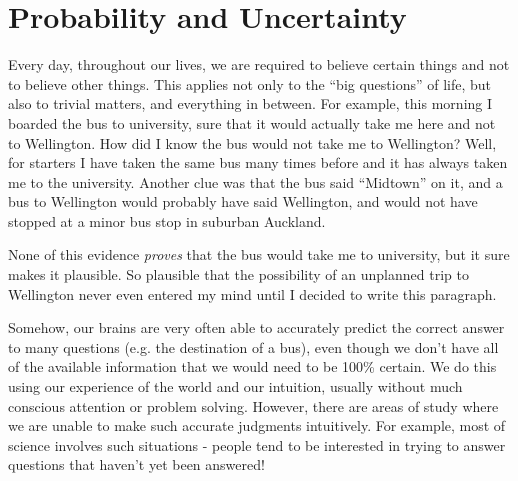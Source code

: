 \chapter{Probability and Uncertainty}
Every day, throughout our lives, we are required 
to believe certain things and not to believe other things. This applies not
only to the ``big questions'' of life, but also to trivial matters, and 
everything in between. For example, this morning I boarded the bus to 
university, sure that it would actually take me here and not to Wellington.
How did I know the bus would not take me to Wellington? Well, for starters
I have taken the same bus many times before and it has always taken me to the
university. Another clue was that the bus said ``Midtown'' on it, and a bus
to Wellington would probably have said Wellington, and would not have stopped
at a minor bus stop in suburban Auckland.

None of this evidence {\it proves} that the bus would take me to university,
but it sure makes it plausible. So plausible that the possibility of an
unplanned trip to Wellington never even entered my mind until I decided to
write this paragraph.

Somehow, our brains are very often able to accurately predict the correct answer
to many questions (e.g. the destination of a bus), even though we don't have
all of the available information that we would need to be 100\% certain.
We do this using our experience of the world and our intuition, usually 
without much conscious attention or problem solving. However, there are areas
of study where we are unable to make such accurate judgments intuitively.
For example, most of science involves such situations - people tend to be
interested in trying to answer questions that haven't yet been answered!
